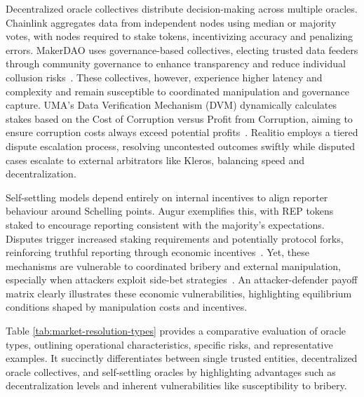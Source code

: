 {Decentralized oracle collectives distribute decision-making across multiple oracles. Chainlink aggregates data from independent nodes using median or majority votes, with nodes required to stake tokens, incentivizing accuracy and penalizing errors. MakerDAO uses governance-based collectives, electing trusted data feeders through community governance to enhance transparency and reduce individual collusion risks~\cite{ClEsGS21}. These collectives, however, experience higher latency and complexity and remain susceptible to coordinated manipulation and governance capture. UMA’s Data Verification Mechanism (DVM) dynamically calculates stakes based on the Cost of Corruption versus Profit from Corruption, aiming to ensure corruption costs always exceed potential profits~\cite{CLL19}. Realitio employs a tiered dispute escalation process, resolving uncontested outcomes swiftly while disputed cases escalate to external arbitrators like Kleros, balancing speed and decentralization.

Self-settling models depend entirely on internal incentives to align reporter behaviour around Schelling points. Augur exemplifies this, with REP tokens staked to encourage reporting consistent with the majority's expectations. Disputes trigger increased staking requirements and potentially protocol forks, reinforcing truthful reporting through economic incentives~\cite{AKPWZ19}. Yet, these mechanisms are vulnerable to coordinated bribery and external manipulation, especially when attackers exploit side-bet strategies~\cite{BF19}. An attacker-defender payoff matrix clearly illustrates these economic vulnerabilities, highlighting equilibrium conditions shaped by manipulation costs and incentives.

Table \ref{tab:market-resolution-types} provides a comparative evaluation of oracle types, outlining operational characteristics, specific risks, and representative examples. It succinctly differentiates between single trusted entities, decentralized oracle collectives, and self-settling oracles by highlighting advantages such as decentralization levels and inherent vulnerabilities like susceptibility to bribery.

}
